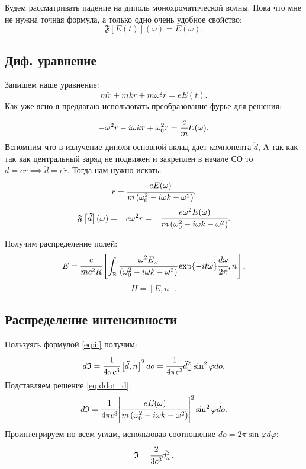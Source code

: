 \documentclass[a4paper]{article}
\newcommand{\inner}[1]{\left( #1 \right)}
\newcommand{\insqr}[1]{\left[ #1 \right]}
\renewcommand{\phi}{\varphi}
\newcommand{\re}{\mathbb{R}}
\numberwithin{equation}{section}
\begin{document}
Будем рассматривать падение на диполь монохроматической волны. 
Пока что мне не нужна точная формула, а только одно очень 
удобное свойство:
\begin{equation}
    \mathfrak F\insqr{ E (t)}(\omega) =  E (\omega).
\end{equation}

\subsection{Диф. уравнение}
 
Запишем наше уравнение:
\begin{equation}
    m \ddot r + mk\dot r + m\omega_0^2r = e E(t).
\end{equation}
Как уже ясно я предлагаю использовать преобразование фурье для решения:
\begin{equation}
    -\omega^2 r - i\omega kr + \omega_0^2r = \cfrac{e}{m} E(\omega).
\end{equation}
Вспомним что в излучение диполя основной вклад дает компонента $\ddot d$,
А так как так как центральный заряд не подвижен и закреплен в начале СО 
то $ d = e r \implies \ddot{{{d}}} = e\ddot{{r}}$. Тогда 
нам нужно искать:
\begin{equation}
    r = \cfrac{eE(\omega)}{m\inner{\omega_0^2 - i\omega k - \omega^2 }}.
\end{equation}
\begin{equation}
    \mathfrak F \insqr{\ddot d}(\omega)= -e\omega^2 r = 
    -\cfrac{e\omega^2E(\omega)}{m\inner{\omega_0^2 - i\omega k 
    - \omega^2 }}.
    \label{eq:ddot_d}
\end{equation}

Получим распределение полей:
\begin{equation}
    E = \cfrac{e}{mc^2R}\insqr{\int_\re
    \cfrac{\omega^2E_\omega}{\inner{\omega_0^2 - i\omega k - \omega^2 }}\exp{-it\omega}\cfrac{d\omega}{2\pi}, n},
    \label{eq:fild}
\end{equation}
\begin{equation}
    H = \insqr{E, n}.
\end{equation}

\subsection{Распределение интенсивности}

Пользуясь формулой \ref{eq:if} получим:
\begin{equation}
    d\mathfrak{I} = \cfrac{1}{4\pi c^3}\insqr{\ddot{d}, n}^2do
    = \cfrac{1}{4\pi c^3}\ddot d^2_\omega \sin^2\phi do.
\end{equation}
Подставляем решение \ref{eq:ddot_d}:
\begin{equation}
    d\mathfrak{I} = \cfrac{1}{4\pi c^3} \abs{\cfrac{eE(\omega)}{m\inner{\omega_0^2 
    - i\omega k - \omega^2 }}}^2 \sin^2\phi do.
\end{equation}
Проинтегрируем по всем углам, использовав соотношение $do = 2 \pi \sin{\phi} d\phi$:
\begin{equation}
    \mathfrak{I} = \cfrac{2}{3c^3} \ddot{d}^2_\omega.
\end{equation}
\end{document}
